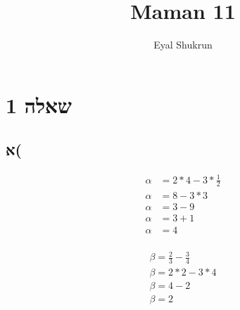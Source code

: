 \documentclass{article}
\title{Maman 11}
\author{Eyal Shukrun}
\begin{document}
\maketitle

\section{שאלה 1}
\subsection{א(}
\begin{align*}
  \alpha &= 2*4 - 3*\frac{1}{2}\\
  \alpha &= 8 - 3*3\\
  \alpha &= 3 - 9\\
  \alpha &= 3 + 1\\
  \alpha &= 4\\
\end{align*} 

\begin{align*}
  \beta = \frac{2}{3} - \frac{3}{4}\\
  \beta = 2*2 - 3*4\\
  \beta = 4 - 2\\
  \beta = 2\\
\end{align*}
\end{document}
